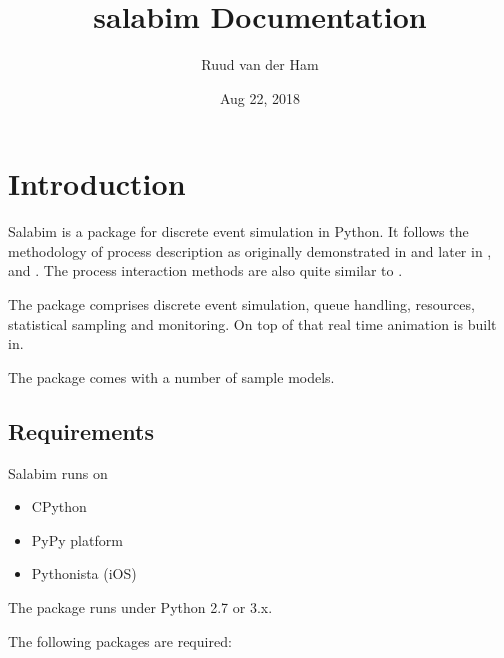 \documentclass[letterpaper,10pt,english]{sphinxmanual}
\title{salabim Documentation}
\date{Aug 22, 2018}
\author{Ruud van der Ham}
\begin{document}
\maketitle
\sphinxtableofcontents
{}\label{\detokenize{index::doc}}



\chapter{Introduction}
\label{\detokenize{Introduction:documentation-for-salabim}}\label{\detokenize{Introduction:introduction}}\label{\detokenize{Introduction::doc}}
Salabim is a package for discrete event simulation in Python.
It follows the methodology of process description as originally demonstrated in 
and later in ,  and . 
The process interaction methods are also quite similar to .

The package comprises discrete event simulation, queue handling, resources, statistical sampling and monitoring.
On top of that real time animation is built in.

The package comes with a number of sample models.


\section{Requirements}
\label{\detokenize{Introduction:requirements}}
Salabim runs on
\begin{itemize}
\item {} 
CPython

\item {} 
PyPy platform

\item {} 
Pythonista (iOS)

\end{itemize}

The package runs under Python 2.7 or 3.x.

The following packages are required:
\end{document}
